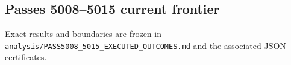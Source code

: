 \subsection*{Passes 5008--5015 current frontier}
Exact results and boundaries are frozen in \texttt{analysis/PASS5008\_5015\_EXECUTED\_OUTCOMES.md} and the associated JSON certificates.
